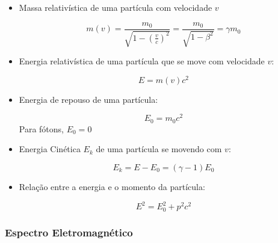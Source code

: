 \documentclass[11pt,a4paper]{article}
\begin{document}
            \begin{itemize}
                \item Massa relativística de uma partícula com velocidade $v$
                
                    \begin{equation}
                        m(v) = 
                        \frac{m_0}{\sqrt{1 - \left(\frac{v}{c}\right)^2}} = 
                        \frac{m_0}{\sqrt{1 - \beta^2}} =
                        \gamma m_0
                    \end{equation}

                \item Energia relativística de uma partícula que se move com velocidade $v$:
                    
                    \begin{equation}
                        E = m(v)c^2
                    \end{equation}

                \item Energia de repouso de uma partícula:
                
                    \begin{equation}
                        E_0 = m_0 c^2
                    \end{equation}
                    Para fótons, $E_0 = 0$

                \item Energia Cinética $E_k$ de uma partícula se movendo com $v$:
                
                    \begin{equation}
                        E_k = E - E_0 = (\gamma -1)E_0
                    \end{equation}
                    
                \item Relação entre a energia e o momento da partícula:
                
                    \begin{equation}
                        E^2 = E_0^2 + p^2c^2
                    \end{equation}
            \end{itemize}

            \subsubsection{Espectro Eletromagnético}
\end{document}
